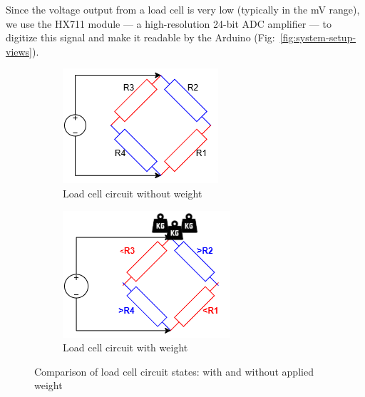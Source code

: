 Since the voltage output from a load cell is very low (typically in the mV range), we use the HX711 module — a high-resolution 24-bit ADC amplifier — to digitize this signal and make it readable by the Arduino (Fig:~\ref{fig:system-setup-views}).
\begin{figure}[H]
    \centering
    \begin{subfigure}[b]{0.45\linewidth}
        \centering
        \includegraphics[width=\linewidth]{load cell images/loadcell_curcuit-.drawio.png}
        \caption{Load cell circuit without weight}
        \label{fig:loadcell-weight}
    \end{subfigure}
    \hfill
    \begin{subfigure}[b]{0.45\linewidth}
        \centering
        \includegraphics[width=\linewidth]{load cell images/loadcell_curcuit-weight.drawio.png}
        \caption{Load cell circuit with weight}
        \label{fig:loadcell-noweight}
    \end{subfigure}
    \caption{Comparison of load cell circuit states: with and without applied weight}
    \label{fig:loadcell-circuit-comparison}
\end{figure}
